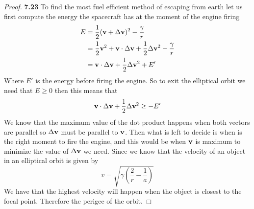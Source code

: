 \documentclass[11pt]{article}
\theoremstyle{definition}
\begin{document}
\cleardoublepage
    \begin{proof}{\textbf{7.23}}
        To find the most fuel efficient method of escaping from earth let us first
        compute the energy the spacecraft has at the moment of the engine firing
        \begin{align*}
            E &= \frac{1}{2}(\vectorbold{v} + \Delta\vectorbold{v})^2 - \frac{\gamma}{r}\\
              &= \frac{1}{2}\vectorbold{v}^2 + \vectorbold{v}\cdot \Delta\vectorbold{v} +
              \frac{1}{2}\Delta\vectorbold{v}^2 - \frac{\gamma}{r}\\
              &= \vectorbold{v}\cdot \Delta\vectorbold{v} +
              \frac{1}{2}\Delta\vectorbold{v}^2 + E' 
        \end{align*}
        Where $E'$ is the energy before firing the engine. So to exit the elliptical orbit
        we need that $E \geq 0$ then this means that
        $$\vectorbold{v}\cdot \Delta\vectorbold{v} + \frac{1}{2}\Delta\vectorbold{v}^2
        \geq -E'$$
        We know that the maximum value of the dot product happens when both vectors are
        parallel so $\Delta \vectorbold{v}$ must be parallel to $\vectorbold{v}$.
        Then what is left to decide is when is the right moment to fire the engine, and
        this would be when $\vectorbold{v}$ is maximum to minimize the value of
        $\Delta \vectorbold{v}$ we need. Since we know that the velocity of an object in
        an elliptical orbit is given by
        $$v = \sqrt{\gamma(\frac{2}{r} - \frac{1}{a})}$$
        We have that the highest velocity will happen when the object is closest to the
        focal point. Therefore the perigee of the orbit.
    \end{proof}
\cleardoublepage
\end{document}
